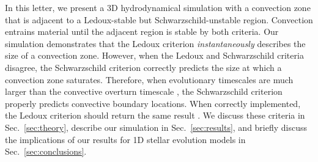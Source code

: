 In this letter, we present a 3D hydrodynamical simulation with a convection zone that is adjacent to a Ledoux-stable but Schwarzschild-unstable region.
Convection entrains material until the adjacent region is stable by both criteria.
Our simulation demonstrates that the Ledoux criterion \emph{instantaneously} describes the size of a convection zone.
However, when the Ledoux and Schwarzschild criteria disagree, the Schwarzschild criterion correctly predicts the size at which a convection zone saturates.
Therefore, when evolutionary timescales are much larger than the convective overturn timescale \citep[e.g., on the main sequence;][]{georgy_etal_2021}, the Schwarzschild criterion properly predicts convective boundary locations.
When correctly implemented, the Ledoux criterion should return the same result \citep{gabriel_etal_2014}.
We discuss these criteria in Sec.~\ref{sec:theory}, describe our simulation in Sec.~\ref{sec:results}, and briefly discuss the implications of our results for 1D stellar evolution models in Sec.~\ref{sec:conclusions}.
